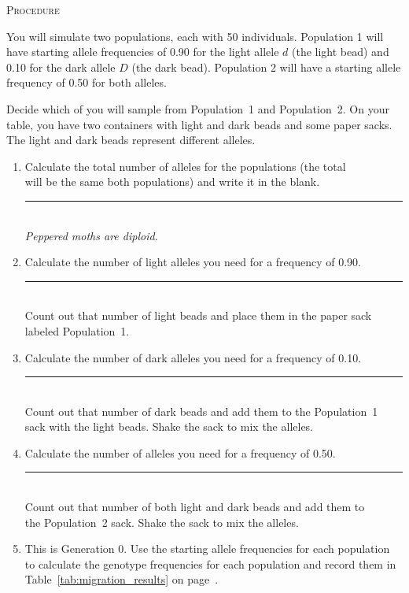 \documentclass[12pt]{exam}
\newcommand{\allele}[1]{$#1$}
\begin{document}
\begin{questions}
\textsc{Procedure}

\medskip

You will simulate two populations, each with 50 individuals. Population 1 will have starting allele frequencies of 0.90 for the light allele \allele{d} (the light bead) and 0.10 for the dark allele \allele{D} (the dark bead). Population 2 will have a starting allele frequency of 0.50 for both alleles. 

Decide which of you will sample from Population~1 and Population~2. On your table, you have two containers with light and dark beads and some paper sacks. The light and dark beads represent different alleles.


\begin{enumerate}

	\item Calculate the total number of alleles for the populations (the total \\ 
	will be the same both populations) and write it in the blank. \hfill \rule{0.5in}{0.4pt}\\ \emph{Peppered moths are diploid.} 
	
	\item Calculate the number of light alleles you need for a frequency of 0.90. \hfill \rule{0.5in}{0.4pt} \\ Count out that number of light beads and place them in the paper sack\\ labeled Population~1. 
		
	\item Calculate the number of dark alleles you need for a frequency of 0.10. \hfill \rule{0.5in}{0.4pt} \\ Count out that number of dark beads and add them to the Population~1\\
	 sack with the light beads. Shake the sack to mix the alleles.

	\item Calculate the number of alleles you need for a frequency of 0.50. \hfill \rule{0.5in}{0.4pt} \\ Count out that number of both light and dark beads and add them to \\
	the Population~2 sack. Shake the sack to mix the alleles.

	\item This is Generation 0. Use the starting allele frequencies for each population to calculate the genotype frequencies for each population and record them in Table~\ref{tab:migration_results} on page~\pageref{tab:migration_results}. 


\end{enumerate}
\end{questions}
\end{document}
